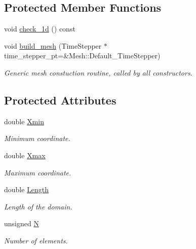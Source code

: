 \subsection*{Protected Member Functions}
\begin{DoxyCompactItemize}
\item 
void \hyperlink{classoomph_1_1OneDMesh_a780eb2a0fdf02690aa5e93efe5ff3848}{check\+\_\+1d} () const
\item 
void \hyperlink{classoomph_1_1OneDMesh_a5a1a27eaa9d58bb85facb617127e9f0a}{build\+\_\+mesh} (Time\+Stepper $\ast$time\+\_\+stepper\+\_\+pt=\&Mesh\+::\+Default\+\_\+\+Time\+Stepper)
\begin{DoxyCompactList}\small\item\em Generic mesh constuction routine, called by all constructors. \end{DoxyCompactList}\end{DoxyCompactItemize}
\subsection*{Protected Attributes}
\begin{DoxyCompactItemize}
\item 
double \hyperlink{classoomph_1_1OneDMesh_ab1c25c2437f203dd1f6d42ec0613e6a1}{Xmin}
\begin{DoxyCompactList}\small\item\em Minimum coordinate. \end{DoxyCompactList}\item 
double \hyperlink{classoomph_1_1OneDMesh_ac625d93f5299895ad5801918a20aea31}{Xmax}
\begin{DoxyCompactList}\small\item\em Maximum coordinate. \end{DoxyCompactList}\item 
double \hyperlink{classoomph_1_1OneDMesh_a9c5ebabd7b2286b5f489563b1106e1b4}{Length}
\begin{DoxyCompactList}\small\item\em Length of the domain. \end{DoxyCompactList}\item 
unsigned \hyperlink{classoomph_1_1OneDMesh_a6f6f4087d7dd7417c79f39f2c3a2865a}{N}
\begin{DoxyCompactList}\small\item\em Number of elements. \end{DoxyCompactList}\end{DoxyCompactItemize}


